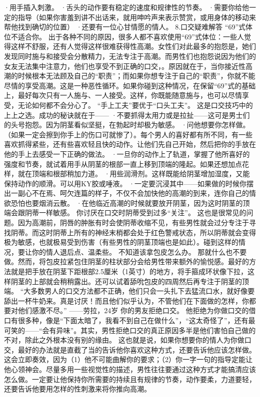 \documentclass[12pt,UTF8]{ctexbook}
\begin{document}
·用手插入刺激。
·舌头的动作要有稳定的速度和规律性的节奏。
·需要你给他一定的指导（如果你害羞到讲不出话来，就用呻吟声来表示赞赏，或用身体的移动来帮他找到确切的位置）
·还要有一位心甘情愿的情人。
8.口交疑难解答
“69”式体位不适合你。
出于各种不同的原因，很多人都不喜欢使用“69”式体位：一些人觉得这样不舒服，还有人觉得这样很难获得性高潮。女性们对此最多的抱怨是，她们发现同时施与和接受会分散精力，无法专注于高潮。而男性们也抱怨说因为他们的女友无法集中注意力，他们也享受不到正确的口交，。原因就在于，当你接近性高潮的时候根本无法顾及自己的“职责”；而如果你想专注于自己的“职责”，你就不能尽情的享受高潮。这是一种恶性循环。如果你碰到这种情况，在保留“69”式的基础上，最好每次只有一人施与、一人接受。这样，你既能随意施与，也可以尽情享受，无论如何都不会分心了。
“手上工夫”要优于“口头工夫”。
这是口交技巧中的上上之选。成功的秘诀就在于——
·不要抓得太用力或是拉扯——这可是男士们的头号抱怨。因为阴茎看似坚挺，在勃起时却极为敏感。
·问他想要你怎样做。（如果一定会擦到你手上的伤口可就惨了）。每个男人的喜好都有所不同，有一些喜欢抓得紧些，还有些喜欢轻且快的动作。让他们先自己开始，然后把你的手放在他的手上去感受一下正确的做法。
·一旦你的动作上了轨道，掌握了他所喜好的强度和节奏，就试着用手从阴茎的根部一直上移到顶端的隆起。如果还想加点花样，就在顶端和根部稍加力道。
·用些润滑剂。这样既能给阴茎增加湿度，又能保持动作的顺滑。可以用KY胶或唾液。
·一定要沉浸其中——如果做的时候你摆出一副心不在焉、呵欠连篇的样子，不仅不会加快他的高潮的到来，连你自己的情欲恐怕也要烟消云散。
·在他临近高潮的时候就要放开阴茎，因为这时阴茎的顶端会跟阴蒂一样敏感。
你讨厌在口交时阴蒂受到过多“关注”。
这也是很常见的问题。因为高潮前，阴唇的肿胀有时会使阴蒂收缩不见，有些男性就会过分专注于寻找阴蒂。而这时阴蒂上所有的神经末梢都会处于红色警戒状态，所以阴蒂就会变得极为敏感，也就极易受到伤害（有些男性的阴茎顶端也是如此）。碰到这样的情况，要让你的情人退后点、温柔些。
不知道该拿包皮怎么办。
那就什么也不要做。然而，将包皮拉紧包住阴茎的柱状部分会给男性带来额外的愉悦感。最好的方法就是把手放在阴茎下距根部2.5厘米（1英寸）的地方，将手箍成环状像下拉，这样阴茎的上部就会稍稍露出。还可以试着舔吮包皮的四周然后再专注于阴茎的顶端。
“大多数男人的口交方法都不正确，他们只会一头扎下去猛流口水，就好像要舔出一杯牛奶来。真是讨厌！而且他们似乎认为，不管他们在下面做的怎样，你都要对他们感激不尽。”
——劳拉，24岁
你的男友拒绝口交。
他拒绝为你做口交的借口有很多种，像是“下面太暗了，我看不到自己在做什么”，“这太奇怪了”，还有最可笑的——“会有异味”。其实，男性拒绝口交的真正原因多半是他们害怕自己做的不对，除此之外根本没有别的缘由。
这也就是说，如果你想要你的情人为你做口交，最好的办法就是直截了当的告诉他你喜欢这种方式，还要告诉他应该怎样做。
这会立即奏效，因为（1）他不可能曲解你的要求；（2）你一字一句的指导定能让他心领神会。尽量多用一些视觉性的描述，男性往往要通过这种方式才能搞清应该怎么做。一定要让他保持你所需要的持续且有规律的节奏，动作要柔，力道要轻，还要告诉他要用怎样的性刺激来将你推向高潮。
\end{document}
